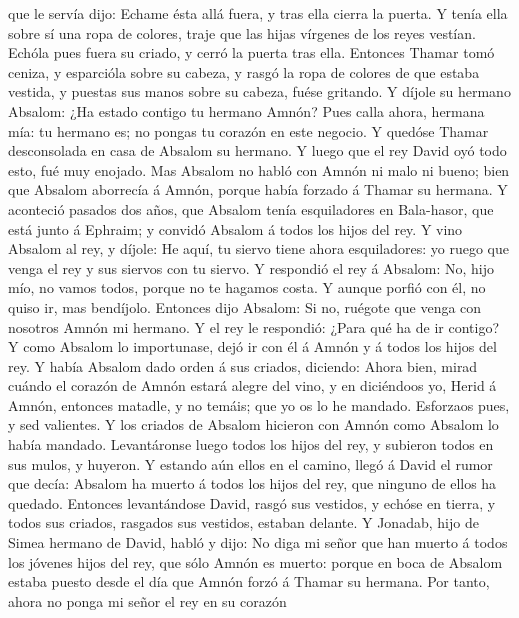 que le servía dijo: Echame ésta allá fuera, y tras ella cierra la
puerta.  Y tenía ella sobre sí una ropa de colores, traje
que las hijas vírgenes de los reyes vestían. Echóla pues fuera su
criado, y cerró la puerta tras ella.  Entonces Thamar
tomó ceniza, y esparcióla sobre su cabeza, y rasgó la ropa de colores de
que estaba vestida, y puestas sus manos sobre su cabeza, fuése gritando.
 Y díjole su hermano Absalom: ¿Ha estado contigo tu
hermano Amnón? Pues calla ahora, hermana mía: tu hermano es; no pongas
tu corazón en este negocio. Y quedóse Thamar desconsolada en casa de
Absalom su hermano.  Y luego que el rey David oyó todo
esto, fué muy enojado.  Mas Absalom no habló con Amnón ni
malo ni bueno; bien que Absalom aborrecía á Amnón, porque había forzado
á Thamar su hermana.  Y aconteció pasados dos años, que
Absalom tenía esquiladores en Bala-hasor, que está junto á Ephraim; y
convidó Absalom á todos los hijos del rey.  Y vino
Absalom al rey, y díjole: He aquí, tu siervo tiene ahora esquiladores:
yo ruego que venga el rey y sus siervos con tu siervo.  Y
respondió el rey á Absalom: No, hijo mío, no vamos todos, porque no te
hagamos costa. Y aunque porfió con él, no quiso ir, mas bendíjolo.
 Entonces dijo Absalom: Si no, ruégote que venga con
nosotros Amnón mi hermano. Y el rey le respondió: ¿Para qué ha de ir
contigo?  Y como Absalom lo importunase, dejó ir con él á
Amnón y á todos los hijos del rey.  Y había Absalom dado
orden á sus criados, diciendo: Ahora bien, mirad cuándo el corazón de
Amnón estará alegre del vino, y en diciéndoos yo, Herid á Amnón,
entonces matadle, y no temáis; que yo os lo he mandado. Esforzaos pues,
y sed valientes.  Y los criados de Absalom hicieron con
Amnón como Absalom lo había mandado. Levantáronse luego todos los hijos
del rey, y subieron todos en sus mulos, y huyeron.  Y
estando aún ellos en el camino, llegó á David el rumor que decía:
Absalom ha muerto á todos los hijos del rey, que ninguno de ellos ha
quedado.  Entonces levantándose David, rasgó sus
vestidos, y echóse en tierra, y todos sus criados, rasgados sus
vestidos, estaban delante.  Y Jonadab, hijo de Simea
hermano de David, habló y dijo: No diga mi señor que han muerto á todos
los jóvenes hijos del rey, que sólo Amnón es muerto: porque en boca de
Absalom estaba puesto desde el día que Amnón forzó á Thamar su hermana.
 Por tanto, ahora no ponga mi señor el rey en su corazón
